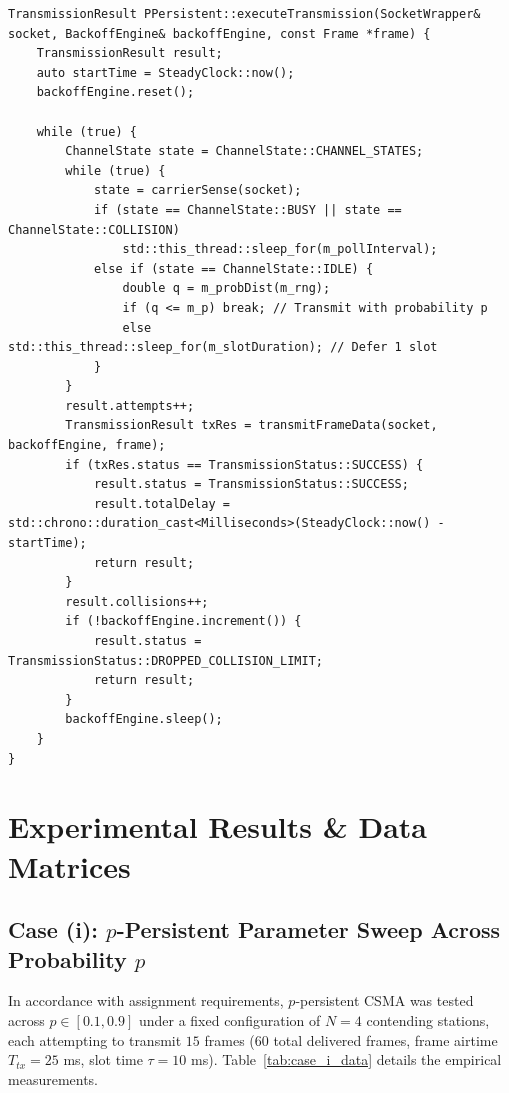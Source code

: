 \documentclass[11pt,a4paper]{article}
\begin{document}
\begin{lstlisting}[caption={$p$-Persistent CSMA Transmission Loop (src/csma.cpp)}]
TransmissionResult PPersistent::executeTransmission(SocketWrapper& socket, BackoffEngine& backoffEngine, const Frame *frame) {
    TransmissionResult result;
    auto startTime = SteadyClock::now();
    backoffEngine.reset();

    while (true) {
        ChannelState state = ChannelState::CHANNEL_STATES;
        while (true) {
            state = carrierSense(socket);
            if (state == ChannelState::BUSY || state == ChannelState::COLLISION)
                std::this_thread::sleep_for(m_pollInterval);
            else if (state == ChannelState::IDLE) {
                double q = m_probDist(m_rng);
                if (q <= m_p) break; // Transmit with probability p
                else          std::this_thread::sleep_for(m_slotDuration); // Defer 1 slot
            }
        }
        result.attempts++;
        TransmissionResult txRes = transmitFrameData(socket, backoffEngine, frame);
        if (txRes.status == TransmissionStatus::SUCCESS) {
            result.status = TransmissionStatus::SUCCESS;
            result.totalDelay = std::chrono::duration_cast<Milliseconds>(SteadyClock::now() - startTime);
            return result;
        }
        result.collisions++;
        if (!backoffEngine.increment()) {
            result.status = TransmissionStatus::DROPPED_COLLISION_LIMIT;
            return result;
        }
        backoffEngine.sleep();
    }
}
\end{lstlisting}

\section{Experimental Results \& Data Matrices}

\subsection{Case (i): $p$-Persistent Parameter Sweep Across Probability $p$}
In accordance with assignment requirements, $p$-persistent CSMA was tested across $p \in [0.1, 0.9]$ under a fixed configuration of $N = 4$ contending stations, each attempting to transmit $15$ frames ($60$ total delivered frames, frame airtime $T_{tx} = 25$ ms, slot time $\tau = 10$ ms). Table~\ref{tab:case_i_data} details the empirical measurements.
\end{document}
